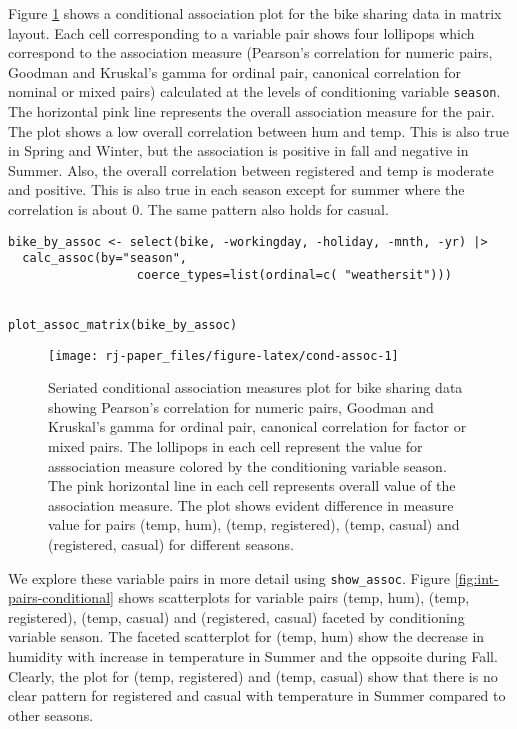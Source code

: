 Figure \ref{fig:cond-assoc} shows a conditional association plot for the bike sharing data in matrix layout. Each cell corresponding to a variable pair shows four lollipops which correspond to the association measure (Pearson's correlation for numeric pairs, Goodman and Kruskal's gamma for ordinal pair, canonical correlation for nominal or mixed pairs) calculated at the levels of conditioning variable \texttt{season}. The horizontal pink line represents the overall association measure for the pair. The plot shows a low overall correlation between hum and temp. This is also true in Spring and Winter, but the association is positive in fall and negative in Summer. Also, the overall correlation between registered and temp is moderate and positive. This is also true in each season except for summer where the correlation is about 0. The same pattern also holds for casual.

\begin{verbatim}
bike_by_assoc <- select(bike, -workingday, -holiday, -mnth, -yr) |>
  calc_assoc(by="season", 
                  coerce_types=list(ordinal=c( "weathersit")))


plot_assoc_matrix(bike_by_assoc)
\end{verbatim}

\begin{figure}

{\centering \texttt{[image: rj-paper\_files/figure-latex/cond-assoc-1]} 

}

\caption{Seriated conditional association measures plot for bike sharing data showing Pearson's correlation for numeric pairs, Goodman and Kruskal's gamma for ordinal pair, canonical correlation for factor or mixed pairs. The lollipops in each cell represent the value for asssociation measure colored by the conditioning variable season. The pink horizontal line in each cell represents overall value of the association measure. The plot shows evident difference in measure value for pairs (temp, hum), (temp, registered), (temp, casual) and (registered, casual) for different seasons.}\label{fig:cond-assoc}
\end{figure}

We explore these variable pairs in more detail using \texttt{show\_assoc}. Figure \ref{fig:int-pairs-conditional} shows scatterplots for variable pairs (temp, hum), (temp, registered), (temp, casual) and (registered, casual) faceted by conditioning variable season. The faceted scatterplot for (temp, hum) show the decrease in humidity with increase in temperature in Summer and the oppsoite during Fall. Clearly, the plot for (temp, registered) and (temp, casual) show that there is no clear pattern for registered and casual with temperature in Summer compared to other seasons.

